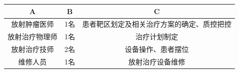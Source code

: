 \documentclass[a4paper]{article}
\begin{document}
\begin{tabular}{|c|c|c|}
\hline
A & B & C \\
\hline
放射肿瘤医师 & 1名 & 患者靶区划定及相关治疗方案的确定、质控把控 \\
\hline
放射治疗物理师 & 1名 & 治疗计划制定 \\
\hline
放射治疗技师 & 2名 & 设备操作、患者摆位 \\
\hline
维修人员 & 1名 & 放射治疗设备维修 \\
\hline
\end{tabular}
\end{document}

